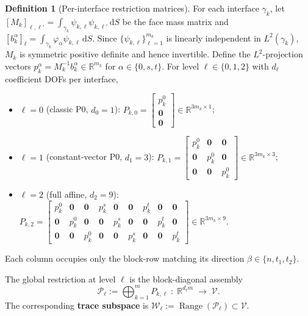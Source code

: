 \documentclass[11pt,a4paper]{article}
\theoremstyle{definition}
\newtheorem{definition}[theorem]{Definition}
\newcommand{\R}{\mathbb{R}}
\newcommand{\iface}{\gamma}
\newcommand{\zero}{\bm{0}}
\newcommand{\Range}{\operatorname{Range}}
\newcommand{\Vspace}{\mathcal{V}}
\newcommand{\Wspace}{\mathcal{W}}
\newcommand{\Pcal}{\mathcal{P}}
\begin{document}
\begin{definition}[Per-interface restriction matrices]\label{def:Pkl}
  For each interface $\iface_k$, let
  $[M_k]_{\ell,\ell'} = \int_{\iface_k}\psi_{k,\ell}\psi_{k,\ell'}\,\mathrm{d}S$
  be the face mass matrix and
  $[b_k^\alpha]_\ell = \int_{\iface_k} \varphi_\alpha\psi_{k,\ell}\,\mathrm{d}S$.
  Since $\{\psi_{k,\ell}\}_{\ell=1}^{m_k}$ is linearly independent in
  $L^2(\iface_k)$, $M_k$ is symmetric positive definite and hence
  invertible.  Define the $L^2$-projection vectors
  $p_k^\alpha = M_k^{-1} b_k^\alpha \in \R^{m_k}$ for
  $\alpha\in\{0,s,t\}$.
  For level $\ell\in\{0,1,2\}$ with $d_\ell$ coefficient DOFs per interface,
  \begin{itemize}
    \item $\ell=0$ (classic P0, $d_0=1$):
      $P_{k,0} = \begin{bmatrix} p_k^0 \\ \zero \\ \zero \end{bmatrix}
       \in \R^{3m_k\times 1}$;
    \item $\ell=1$ (constant-vector P0, $d_1=3$):
      $P_{k,1} = \begin{bmatrix}
        p_k^0 & \zero   & \zero   \\
        \zero & p_k^0   & \zero   \\
        \zero & \zero   & p_k^0
      \end{bmatrix} \in \R^{3m_k\times 3}$;
    \item $\ell=2$ (full affine, $d_2=9$):
      $P_{k,2} = \begin{bmatrix}
        p_k^0 & \zero & \zero & p_k^s & \zero & \zero & p_k^t & \zero & \zero \\[2pt]
        \zero & p_k^0 & \zero & \zero & p_k^s & \zero & \zero & p_k^t & \zero \\[2pt]
        \zero & \zero & p_k^0 & \zero & \zero & p_k^s & \zero & \zero & p_k^t
      \end{bmatrix} \in \R^{3m_k\times 9}$.
  \end{itemize}
  Each column occupies only the block-row matching its direction
  $\beta\in\{n,t_1,t_2\}$.
\end{definition}

The global restriction at level $\ell$ is the block-diagonal assembly
\begin{equation}\label{eq:Pcal}
  \Pcal_\ell := \bigoplus_{k=1}^m P_{k,\ell}
  \;:\; \R^{d_\ell m} \;\longrightarrow\; \Vspace.
\end{equation}
The corresponding \textbf{trace subspace} is
$\Wspace_\ell := \Range(\Pcal_\ell) \subset \Vspace$.
\end{document}
